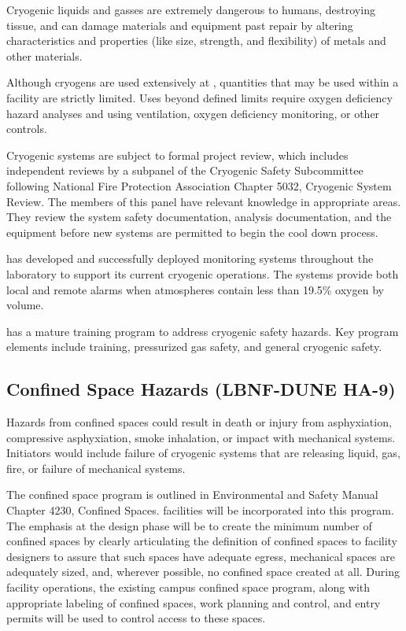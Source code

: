 Cryogenic liquids and gasses are extremely dangerous to humans,
destroying tissue, and can damage materials and equipment past repair
by altering characteristics and properties (like size, strength, and
flexibility) of metals and other materials.

Although cryogens are used extensively at \fnal, quantities that may
be used within a facility are strictly limited. Uses beyond defined
limits require oxygen deficiency hazard analyses and using
ventilation, oxygen deficiency monitoring, or other controls.

Cryogenic systems are subject to formal project review, which includes
independent reviews by a subpanel of the Cryogenic Safety Subcommittee
following National Fire Protection Association Chapter 5032, Cryogenic
System Review. The members of this panel have relevant knowledge in
appropriate areas. They review the system safety documentation,
 analysis documentation, and the equipment before new
systems are permitted to begin the cool down process.

\fnal has developed and successfully deployed  monitoring
systems throughout the laboratory to support its current cryogenic
operations. The systems provide both local and remote alarms when
atmospheres contain less than 19.5\% oxygen by volume.

\fnal has a mature training program to address cryogenic safety
hazards. Key program elements include  training,
pressurized gas safety, and general cryogenic safety.


\subsection{Confined Space Hazards (LBNF-DUNE HA-9)}

Hazards from confined spaces could result in death or injury from
asphyxiation, compressive asphyxiation, smoke inhalation, or impact
with mechanical systems. Initiators would include failure of cryogenic
systems that are releasing liquid, gas, fire, or failure of mechanical
systems.

The \fnal confined space program is outlined in \fnal Environmental
and Safety Manual Chapter 4230, Confined
Spaces.  facilities will be incorporated into
this program. The emphasis at the  design
phase will be to create the minimum number of confined spaces by
clearly articulating the definition of confined spaces to facility
designers to assure that such spaces have adequate egress, mechanical
spaces are adequately sized, and, wherever possible, no confined space
created at all. During facility operations, the existing campus
confined space program, along with appropriate labeling of confined
spaces, work planning and control, and entry permits will be used to
control access to these spaces.



